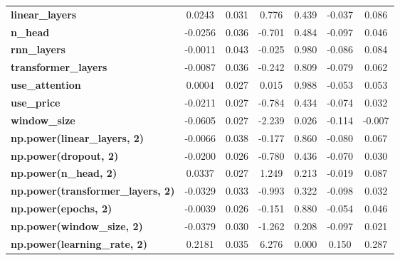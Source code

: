 \begin{center}
\begin{tabular}{lcccccc}
\textbf{linear\_layers}                   &       0.0243  &        0.031     &     0.776  &         0.439        &       -0.037    &        0.086     \\
\textbf{n\_head}                          &      -0.0256  &        0.036     &    -0.701  &         0.484        &       -0.097    &        0.046     \\
\textbf{rnn\_layers}                      &      -0.0011  &        0.043     &    -0.025  &         0.980        &       -0.086    &        0.084     \\
\textbf{transformer\_layers}              &      -0.0087  &        0.036     &    -0.242  &         0.809        &       -0.079    &        0.062     \\
\textbf{use\_attention}                   &       0.0004  &        0.027     &     0.015  &         0.988        &       -0.053    &        0.053     \\
\textbf{use\_price}                       &      -0.0211  &        0.027     &    -0.784  &         0.434        &       -0.074    &        0.032     \\
\textbf{window\_size}                     &      -0.0605  &        0.027     &    -2.239  &         0.026        &       -0.114    &       -0.007     \\
\textbf{np.power(linear\_layers, 2)}      &      -0.0066  &        0.038     &    -0.177  &         0.860        &       -0.080    &        0.067     \\
\textbf{np.power(dropout, 2)}             &      -0.0200  &        0.026     &    -0.780  &         0.436        &       -0.070    &        0.030     \\
\textbf{np.power(n\_head, 2)}             &       0.0337  &        0.027     &     1.249  &         0.213        &       -0.019    &        0.087     \\
\textbf{np.power(transformer\_layers, 2)} &      -0.0329  &        0.033     &    -0.993  &         0.322        &       -0.098    &        0.032     \\
\textbf{np.power(epochs, 2)}              &      -0.0039  &        0.026     &    -0.151  &         0.880        &       -0.054    &        0.046     \\
\textbf{np.power(window\_size, 2)}        &      -0.0379  &        0.030     &    -1.262  &         0.208        &       -0.097    &        0.021     \\
\textbf{np.power(learning\_rate, 2)}      &       0.2181  &        0.035     &     6.276  &         0.000        &        0.150    &        0.287     \\

\end{tabular}
\end{center}
